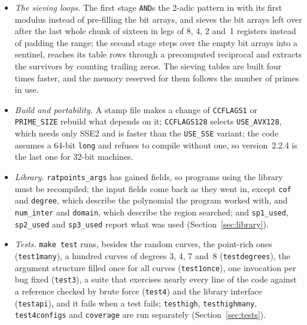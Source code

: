 \documentclass[12pt,a4paper,oneside]{amsart}
\begin{document}
\begin{itemize}
        coefficient, derived from the Newton polygon of~$F$, now runs;
        the forbidden-divisor bit
        arrays cover every excluded prime up to the square root of the
        height bound, and the default of \verb+-F+ is~$64$; the Jacobi
        symbol is a product of table-driven Legendre symbols; the tests on
        $b \bmod 64$ are applied to 64~denominators at a time; the residues
        of~$b$ come from precomputed reciprocals, and the gcd that tests a
        candidate for lowest terms is branchless.
  \item \emph{The sieving loops.} The first stage \texttt{AND}s the 2-adic
        pattern in with its first modulus instead of pre-filling the bit
        arrays, and sieves the bit arrays left over after the last whole
        chunk of sixteen in legs of 8, 4, 2 and~1 registers instead of
        padding the range; the second stage steps over the empty bit arrays
        into a sentinel, reaches its table rows through a precomputed
        reciprocal and extracts the survivors by counting trailing zeros.
        The sieving tables are built four times faster, and the memory
        reserved for them follows the number of primes in use.
  \item \emph{Build and portability.} A stamp file makes a change of
        \texttt{CCFLAGS1} or \texttt{PRIME\_SIZE} rebuild what depends on it;
        \texttt{CCFLAGS128} selects \verb+USE_AVX128+, which needs only SSE2
        and is faster than the \verb+USE_SSE+ variant; the code assumes a
        64-bit \texttt{long} and refuses to compile without one, so
        version~2.2.4 is the last one for 32-bit machines.
  \item \emph{Library.} \texttt{ratpoints\_args} has gained fields, so
        programs using the library must be recompiled; the input fields
        come back as they went in, except \texttt{cof} and \texttt{degree},
        which describe the polynomial the program worked with, and
        \texttt{num\_inter} and \texttt{domain}, which describe the region
        searched; and
        \texttt{sp1\_used}, \texttt{sp2\_used} and \texttt{sp3\_used} report
        what was used (Section~\ref{sec:library}).
  \item \emph{Tests.} \texttt{make test} runs, besides the random curves,
        the point-rich ones (\texttt{test1many}), a hundred curves of
        degrees 3, 4, 7 and~8 (\texttt{testdegrees}), the argument structure
        filled once for all curves (\texttt{test1once}), one invocation per
        bug fixed (\texttt{test3}), a suite that exercises nearly every line of
        the code against a reference checked by brute force (\texttt{test4})
        and the library interface (\texttt{testapi}), and it fails when a
        test fails; \texttt{testhigh}, \texttt{testhighmany},
        \texttt{test4configs} and \texttt{coverage} are run separately
        (Section~\ref{sec:tests}).
\end{itemize}
\end{document}
